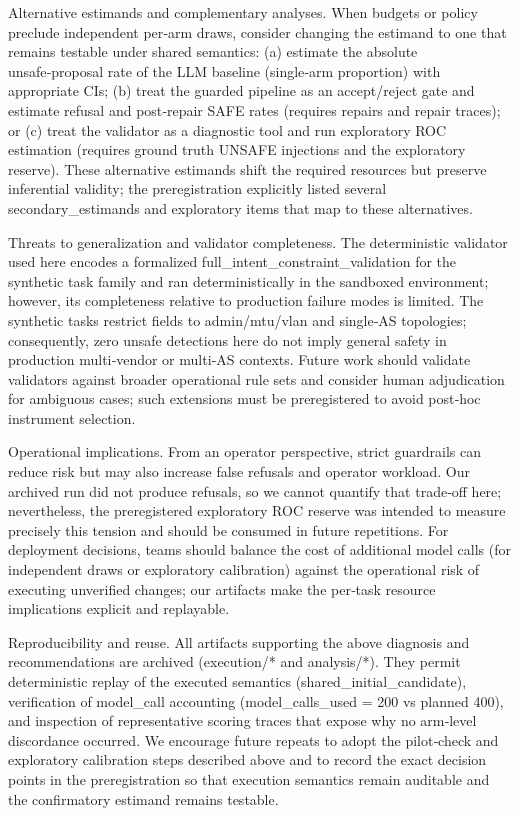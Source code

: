 \documentclass[conference]{IEEEtran}
\begin{document}
Alternative estimands and complementary analyses. When budgets or policy preclude independent per‑arm draws, consider changing the estimand to one that remains testable under shared semantics: (a) estimate the absolute unsafe‑proposal rate of the LLM baseline (single‑arm proportion) with appropriate CIs; (b) treat the guarded pipeline as an accept/reject gate and estimate refusal and post‑repair SAFE rates (requires repairs and repair traces); or (c) treat the validator as a diagnostic tool and run exploratory ROC estimation (requires ground truth UNSAFE injections and the exploratory reserve). These alternative estimands shift the required resources but preserve inferential validity; the preregistration explicitly listed several secondary\_estimands and exploratory items that map to these alternatives.

Threats to generalization and validator completeness. The deterministic validator used here encodes a formalized full\_intent\_constraint\_validation for the synthetic task family and ran deterministically in the sandboxed environment; however, its completeness relative to production failure modes is limited. The synthetic tasks restrict fields to admin/mtu/vlan and single‑AS topologies; consequently, zero unsafe detections here do not imply general safety in production multi‑vendor or multi‑AS contexts. Future work should validate validators against broader operational rule sets and consider human adjudication for ambiguous cases; such extensions must be preregistered to avoid post‑hoc instrument selection.

Operational implications. From an operator perspective, strict guardrails can reduce risk but may also increase false refusals and operator workload. Our archived run did not produce refusals, so we cannot quantify that trade‑off here; nevertheless, the preregistered exploratory ROC reserve was intended to measure precisely this tension and should be consumed in future repetitions. For deployment decisions, teams should balance the cost of additional model calls (for independent draws or exploratory calibration) against the operational risk of executing unverified changes; our artifacts make the per‑task resource implications explicit and replayable.

Reproducibility and reuse. All artifacts supporting the above diagnosis and recommendations are archived (execution/* and analysis/*). They permit deterministic replay of the executed semantics (shared\_initial\_candidate), verification of model\_call accounting (model\_calls\_used = 200 vs planned 400), and inspection of representative scoring traces that expose why no arm‑level discordance occurred. We encourage future repeats to adopt the pilot‑check and exploratory calibration steps described above and to record the exact decision points in the preregistration so that execution semantics remain auditable and the confirmatory estimand remains testable.
\end{document}
